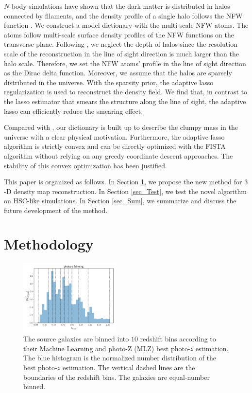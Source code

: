 \documentclass[twocolumn]{aastex63}
\begin{document}
$N$-body simulations have shown that the dark matter is distributed in halos
connected by filaments, and the density profile of a single halo follows the
NFW function \citep{halo-NFW1997ApJ}.  We construct a model dictionary with the
multi-scale NFW atoms.  The atoms follow multi-scale surface density profiles
of the NFW functions \citep{haloModel-TJ2003-3pt} on the transverse plane.
Following \citet{LSS-massMap-Glimpse3D-Leonard2014}, we neglect the depth of
halos since the resolution scale of the reconstruction in the line of sight
direction is much larger than the halo scale. Therefore, we set the NFW atoms'
profile in the line of sight direction as the Dirac delta function.  Moreover,
we assume that the halos are sparsely distributed in the universe.  With the
sparsity prior, the adaptive lasso regularization \citep{AdaLASSO-Zou2006} is
used to reconstruct the density field.  We find that, in contrast to the lasso
estimator that smears the structure along the line of sight, the adaptive lasso
can efficiently reduce the smearing effect.

Compared with \citet{LSS-massMap-Glimpse3D-Leonard2014}, our dictionary is
built up to describe the clumpy mass in the universe with a clear physical
motivation. Furthermore, the adaptive lasso algorithm is strictly convex and
can be directly optimized with the FISTA algorithm \citep{FISTA-Beck2009}
without relying on any greedy coordinate descent approaches. The stability of
this convex optimization has been justified.

This paper is organized as follows.
In Section \ref{sec_Method}, we propose the new method for $3$-D density map
reconstruction.
In Section \ref{sec_Test}, we test the novel algorithm on HSC-like simulations.
In Section \ref{sec_Sum}, we summarize and discuss the future development of
the method.

\section{Methodology}
\label{sec_Method}

\begin{figure}
 \centering
 \includegraphics[width=0.45\textwidth]{photo-z_binning.pdf}
 \caption{The source galaxies are binned into $10$ redshift bins according to
     their Machine Learning and photo-Z (MLZ) best photo-$z$ estimation. The
     blue histogram is the normalized number distribution of the best photo-$z$
     estimation. The vertical dashed lines are the boundaries of the redshift
     bins.  The galaxies are equal-number binned.
        } \label{fig_bestpz}
\end{figure}
\end{document}
